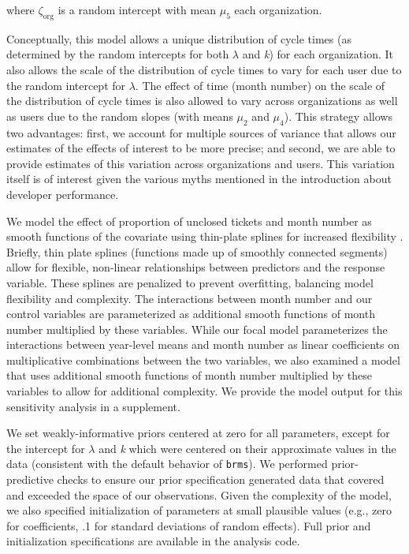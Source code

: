 \documentclass[manuscript,screen,review]{acmart}
\begin{document}
where \(\zeta_{\text{org}}\) is a random intercept with mean \(\mu_5\)
each organization.

Conceptually, this model allows a unique distribution of cycle times (as
determined by the random intercepts for both \(\lambda\) and \emph{k})
for each organization. It also allows the scale of the distribution of
cycle times to vary for each user due to the random intercept for
\(\lambda\). The effect of time (month number) on the scale of the
distribution of cycle times is also allowed to vary across organizations
as well as users due to the random slopes (with means \(\mu_2\) and
\(\mu_4\)). This strategy allows two advantages: first, we account for
multiple sources of variance that allows our estimates of the effects of
interest to be more precise; and second, we are able to provide
estimates of this variation across organizations and users. This
variation itself is of interest given the various myths mentioned in the
introduction about developer performance.

We model the effect of proportion of unclosed tickets and month number
as smooth functions of the covariate using thin-plate splines for
increased flexibility \citep{woodGeneralizedAdditiveModels2017}.
Briefly, thin plate splines (functions made up of smoothly connected
segments) allow for flexible, non-linear relationships between
predictors and the response variable. These splines are penalized to
prevent overfitting, balancing model flexibility and complexity. The
interactions between month number and our control variables are
parameterized as additional smooth functions of month number multiplied
by these variables. While our focal model parameterizes the interactions
between year-level means and month number as linear coefficients on
multiplicative combinations between the two variables, we also examined
a model that uses additional smooth functions of month number multiplied
by these variables to allow for additional complexity. We provide the
model output for this sensitivity analysis in a supplement.

We set weakly-informative priors centered at zero for all parameters,
except for the intercept for \(\lambda\) and \emph{k} which were
centered on their approximate values in the data (consistent with the
default behavior of \texttt{brms}). We performed prior-predictive checks
to ensure our prior specification generated data that covered and
exceeded the space of our observations. Given the complexity of the
model, we also specified initialization of parameters at small plausible
values (e.g., zero for coefficients, .1 for standard deviations of
random effects). Full prior and initialization specifications are
available in the analysis code.
\end{document}
